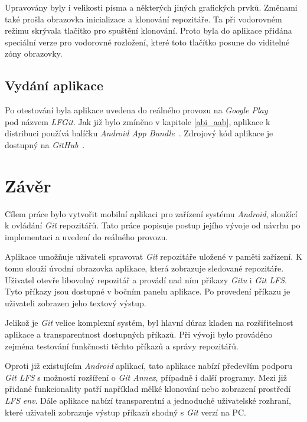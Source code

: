 Upravovány byly i velikosti písma a některých jiných grafických prvků. Změnami také prošla obrazovka inicializace a klonování repozitáře. Ta při vodorovném režimu skrývala tlačítko pro spuštění klonování. Proto byla do aplikace přidána speciální verze pro vodorovné rozložení, které toto tlačítko posune do viditelné zóny obrazovky.

\section{Vydání aplikace}
Po otestování byla aplikace uvedena do reálného provozu na \emph{Google Play}\\ pod názvem \emph{LFGit}. Jak již bylo zmíněno v kapitole \ref{abi_aab}, aplikace k distribuci používá balíčku \emph{Android App Bundle}~. Zdrojový kód aplikace je dostupný na \emph{GitHub}~.

\chapter{Závěr}
Cílem práce bylo vytvořit mobilní aplikaci pro zařízení systému \emph{Android}, sloužící k ovládání \emph{Git} repozitářů. Tato práce popisuje postup jejího vývoje od návrhu po implementaci a uvedení do reálného provozu.

Aplikace umožňuje uživateli spravovat \emph{Git} repozitáře uložené v paměti zařízení. K tomu slouží úvodní obrazovka aplikace, která zobrazuje sledované repozitáře. Uživatel otevře libovolný repozitář a provádí nad ním příkazy \emph{Gitu} i \emph{Git LFS}. Tyto příkazy jsou dostupné v bočním panelu aplikace. Po provedení příkazu je uživateli zobrazen jeho textový výstup.

Jelikož je \emph{Git} velice komplexní systém, byl hlavní důraz kladen na rozšiřitelnost aplikace a transparentnost dostupných příkazů. Při vývoji bylo prováděno zejména testování funkčnosti těchto příkazů a správy repozitářů.

Oproti již existujícím \emph{Android} aplikací, tato aplikace nabízí především podporu \emph{Git LFS} s možností rozšíření o \emph{Git Annex}, případně i další programy. Mezi již přidané funkcionality patří například mělké klonování nebo zobrazení prostředí \emph{LFS env}. Dále aplikace nabízí transparentní a jednoduché uživatelské rozhraní, které uživateli zobrazuje výstup příkazů shodný s \emph{Git} verzí na PC.

